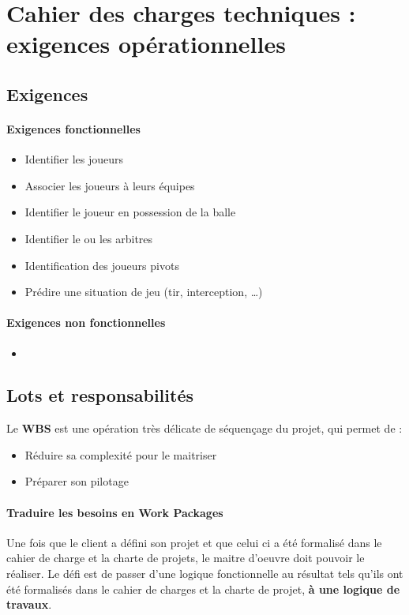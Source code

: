 \section{Cahier des charges techniques : exigences opérationnelles}
\subsection{Exigences}
\paragraph{Exigences fonctionnelles}
\begin{itemize}
    \item Identifier les joueurs 
    \item Associer les joueurs à leurs équipes 
    \item Identifier le joueur en possession de la balle 
    \item Identifier le ou les arbitres 
    \item Identification des joueurs pivots 
    \item Prédire une situation de jeu (tir, interception, \dots)
\end{itemize}
\paragraph{Exigences non fonctionnelles}
\begin{itemize}
    \item 
\end{itemize}
\subsection{Lots et responsabilités}
Le \textbf{WBS} est une opération très délicate de séquençage du projet, qui permet de :
\begin{itemize}
	\item Réduire sa complexité pour le maitriser
	\item Préparer son pilotage
\end{itemize}
\paragraph*{Traduire les besoins en Work Packages}
Une fois que le client a défini son projet et que celui ci a été formalisé dans le cahier de charge et la charte de projets, le maitre d'oeuvre doit pouvoir le réaliser. Le défi est de passer d'une logique fonctionnelle au résultat tels qu'ils ont été formalisés dans le cahier de charges et la charte de projet, \textbf{à une logique de travaux}.


